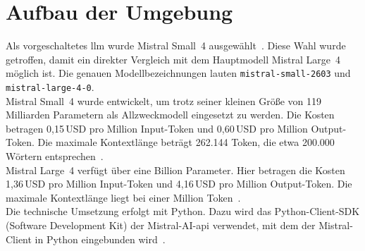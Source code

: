 
\section{Aufbau der Umgebung}\label{sec:aufbau_umgebung}

Als vorgeschaltetes \ac{llm} wurde Mistral Small~4 ausgewählt~\cite{sm15}. Diese Wahl wurde getroffen, damit ein direkter Vergleich mit dem Hauptmodell Mistral Large~4
möglich ist. Die genauen Modellbezeichnungen lauten \texttt{mistral-small-2603} und \texttt{mistral-large-4-0}. \\
Mistral Small~4 wurde entwickelt, um trotz seiner kleinen Größe von 119 Milliarden Parametern als Allzweckmodell eingesetzt zu werden. Die Kosten betragen 0,15\,USD pro
Million Input-Token und 0,60\,USD pro Million Output-Token. Die maximale Kontextlänge beträgt 262.144 Token, die etwa 200.000 Wörtern entsprechen~\cite{sm31}. \\
Mistral Large~4 verfügt über eine Billion Parameter. Hier betragen die Kosten 1,36\,USD pro Million Input-Token und 4,16\,USD pro Million Output-Token. 
Die maximale Kontextlänge liegt bei einer Million Token~\cite{sm32}. \\
Die technische Umsetzung erfolgt mit Python. Dazu wird das Python-Client-SDK (Software Development Kit) der Mistral-AI-\ac{api} verwendet, mit dem der Mistral-Client in 
Python eingebunden wird~\cite{sm33}.

